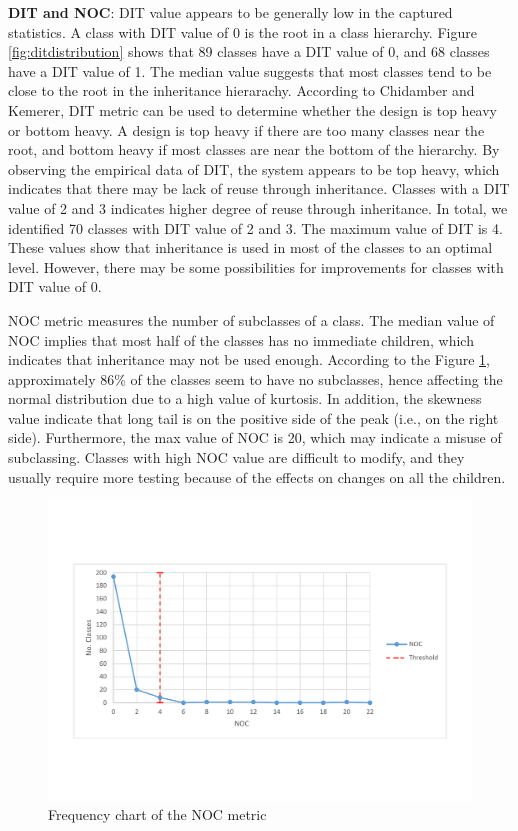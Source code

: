 \textbf{DIT and NOC}: DIT value appears to be generally low in the captured statistics. A class with DIT value of 0 is the root in a class hierarchy. Figure \ref{fig:ditdistribution} shows that 89 classes have a DIT value of 0, and 68 classes have a DIT value of 1. The median value suggests that most classes tend to be close to the root in the inheritance hierarachy. According to Chidamber and Kemerer\cite{chidamber1994metrics}, DIT metric can be used to determine whether the design is top heavy or bottom heavy. A design is top heavy if there are too many classes near the root, and bottom heavy if most classes are near the bottom of the hierarchy. By observing the empirical data of DIT, the system appears to be top heavy, which indicates that there may be lack of reuse through inheritance. Classes with a DIT value of 2 and 3 indicates higher degree of reuse through inheritance. In total, we identified 70 classes with DIT value of 2 and 3. The maximum value of DIT is 4. These values show that inheritance is used in most of the classes to an optimal level. However, there may be some possibilities for improvements for classes with DIT value of 0. 

NOC metric measures the number of subclasses of a class. The median value of NOC implies that most half of the classes has no immediate children, which indicates that inheritance may not be used enough. According to the Figure \ref{fig:nocdistribution}, approximately 86\% of the classes seem to have no subclasses, hence affecting the normal distribution due to a high value of kurtosis. In addition, the skewness value indicate that long tail is on the positive side of the peak (i.e., on the right side). Furthermore, the max value of NOC is 20, which may indicate a misuse of subclassing. Classes with high NOC value are difficult to modify, and they usually require more testing because of the effects on changes on all the children. 

\begin{figure}
	\centering
	\includegraphics[width=\textwidth]{images/threshold/noc.pdf}
	\caption{Frequency chart of the NOC metric}
	\label{fig:nocdistribution}
\end{figure}

